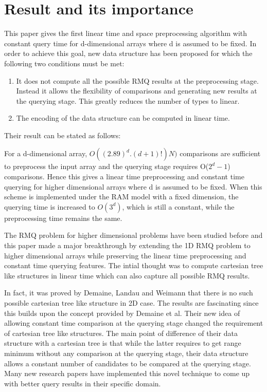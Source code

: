 \section{Result and its importance}
This paper gives the first linear time and space preprocessing algorithm with constant query time for d-dimensional arrays where d is assumed to be fixed. In order to achieve this goal, new data structure has been proposed for which the following two conditions must be met:\par
\begin{enumerate}
\item It does not compute all the possible RMQ results at the preprocessing stage. Instead it allows the flexibility of comparisons and generating new results at the querying stage. This greatly reduces the number of types to linear.\par
\item The encoding of the data structure can be computed in linear time.
\end{enumerate}
Their result can be stated as follows:\par
For a d-dimensional array, $O((2.89)^d.(d+1)!)N)$ comparisons are sufficient to preprocess the input array and the querying stage requires O($2^d-1$) comparisons. Hence this gives a linear time preprocessing and constant time querying for higher dimensional arrays where d is assumed to be fixed. When this scheme is implemented under the RAM model with a fixed dimension, the querying time is increased to $O(3^d)$, which is still a constant, while the preprocessing time remains the same.\par
The RMQ problem for higher dimensional problems have been studied before and this paper made a major breakthrough by extending the 1D RMQ problem to higher dimensional arrays while preserving the linear time preprocessing and constant time querying features. The intial thought was to compute cartesian tree like structures in linear time which can also capture all possible RMQ results.\par
In fact, it was proved by Demaine, Landau and Weimann\cite{p2} that there is no such possible cartesian tree like structure in 2D case.
The results are fascinating since this builds upon the concept provided by Demaine et al. Their new idea of allowing constant time comparison at the querying stage changed the requirement of cartesian tree like structures. The main point of difference of their data structure with a cartesian tree is that while the latter requires to get range minimum without any comparison at the querying stage, their data structure allows a constant number of candidates to be compared at the querying stage. Many new research papers\cite{p14,p11,p12} have implemented this novel technique to come up with better query results in their specific domain.

